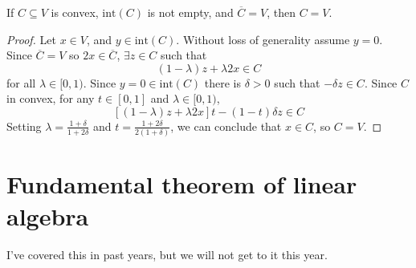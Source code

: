 \begin{lemma}\label{lem:ubiq}
  If $C \subseteq V$ is convex, $\mathrm{int}(C)$ is not empty, and
  $\overline{C} = V$, then $C = V$. 
\end{lemma}
\begin{proof}
  Let $x \in V$, and $y \in \mathrm{int}(C)$.  Without loss of
  generality assume $y = 0$. Since $\overline{C} = V$ so $2x \in \overline{C}$,
  $\exists z \in C$ such that
  \[ (1-\lambda)z + \lambda 2x \in C \]
  for all $\lambda \in [0,1)$. 
  Since $y = 0 \in \mathrm{int}(C)$ there is $\delta>0$ such that 
  $-\delta z \in C$. Since $C$ in convex, for any $t \in [0,1]$ and
  $\lambda \in [0,1)$,
  \[ [(1-\lambda)z + \lambda 2x] t - (1-t) \delta z \in C \]
  Setting $\lambda = \frac{1+\delta}{1+2\delta}$ and $t =
  \frac{1+2\delta}{2(1+\delta)}$, we can conclude that $x \in C$, so
  $C = V$.  
\end{proof}

\section{Fundamental theorem of linear algebra}
I've covered this in past years, but we will not get to it this year.

